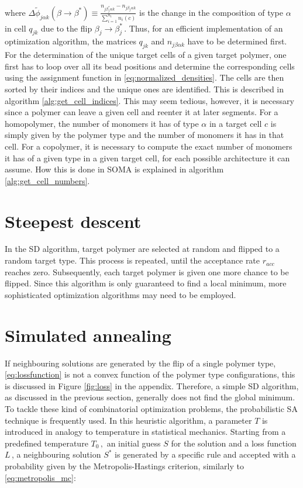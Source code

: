 \documentclass[bachelor,       %
               twoside,        %
               BCOR10mm,       %
               ngerman, english %
               ]{GAUBM}
\begin{document}
where $\Delta\tilde\phi_{ j\alpha k}(\beta\rightarrow\beta^*)\equiv\frac{n_{j\beta_j^*\alpha k}-n_{j\beta_j\alpha k}}{\sum_{i=1}^{n_t}n_i(c)}$ is the change in the composition of type $\alpha$ in cell $q_{jk}$ due to the flip $\beta_j\rightarrow\beta_j^*\,$. Thus, for an efficient implementation of an optimization algorithm, the matrices $q_{jk}$ and $n_{j\beta\alpha k}$ have to be determined first. For the determination of the unique target cells of a given target polymer, one first has to loop over all its bead positions and determine the corresponding cells using the assignment function in \eqref{eq:normalized_densities}. The cells are then sorted by their indices and the unique ones are identified. This is described in algorithm \ref{alg:get_cell_indices}. This may seem tedious, however, it is necessary since a polymer can leave a given cell and reenter it at later segments. For a homopolymer, the number of monomers it has of type $\alpha$ in a target cell $c$ is simply given by the polymer type and the number of monomers it has in that cell. For a copolymer, it is necessary to compute the exact number of monomers it has of a given type in a given target cell, for each possible architecture it can assume. How this is done in \ac{SOMA} is explained in algorithm \ref{alg:get_cell_numbers}. 

\section{Steepest descent}

In the \ac{SD} algorithm, target polymer are selected at random and flipped to a random target type. This process is repeated, until the acceptance rate $r_{acc}$ reaches zero. Subsequently, each target polymer is given one more chance to be flipped. Since this algorithm is only guaranteed to find a local minimum, more sophisticated optimization algorithms may need to be employed.

\section{Simulated annealing}

If neighbouring solutions are generated by the flip of a single polymer type, \eqref{eq:lossfunction} is not a convex function of the polymer type configurations, this is discussed in Figure \ref{fig:loss} in the appendix. Therefore, a simple \ac{SD} algorithm, as discussed in the previous section, generally does not find the global minimum. To tackle these kind of combinatorial optimization problems, the probabilistic \ac{SA} technique \cite{simulated_annealing} is frequently used. In this heuristic algorithm, a parameter $T$ is introduced in analogy to temperature in statistical mechanics. Starting from a predefined temperature $T_0\,,$ an initial guess $S$ for the solution and a loss function $L\,$, a neighbouring solution $S^*$ is generated by a specific rule and accepted with a probability given by the Metropolis-Hastings criterion, similarly to \eqref{eq:metropolis_mc}:
\end{document}

